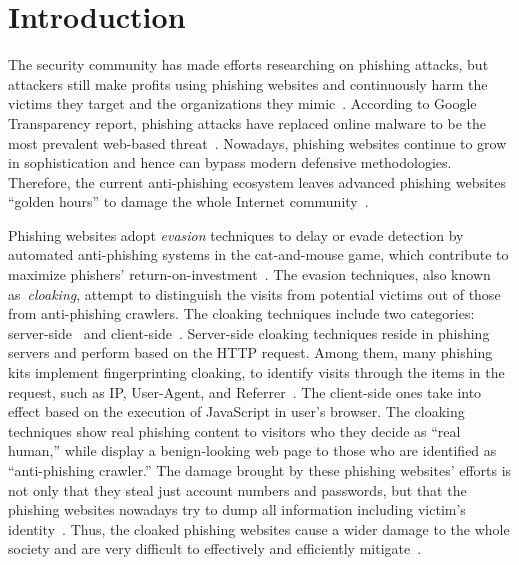 \section{Introduction}

The security community has made efforts researching on phishing attacks,
but attackers still make profits using phishing websites and continuously harm the victims they target and the organizations they mimic~\cite{ho2019detecting, van2019cognitive}.
According to Google Transparency report, phishing attacks have replaced online malware to be the most prevalent web-based threat~\cite{googletransparencyreport, solutions2019verizon}.
Nowadays, phishing websites continue to grow in sophistication and hence can bypass modern defensive methodologies.
Therefore, the current anti-phishing ecosystem leaves advanced phishing websites ``golden hours'' to damage the whole Internet community~\cite{oest2020sunrise}.

Phishing websites adopt \emph{evasion} techniques to delay or evade detection by automated anti-phishing systems in the cat-and-mouse game,
which contribute to maximize phishers' return-on-investment~\cite{thomas2017data}.
The evasion techniques, also known as~\emph{cloaking}, 
attempt to distinguish the visits from potential victims out of those from anti-phishing crawlers.
The cloaking techniques include two categories: server-side~\cite{oest2018inside} and client-side~\cite{zhang2021crawlphish}.
Server-side cloaking techniques reside in phishing servers and perform based on the HTTP request. 
Among them, many phishing kits implement fingerprinting cloaking, to identify visits through the items in the request, such as IP, User-Agent, and Referrer~\cite{oest2018inside}.
The client-side ones take into effect based on the execution of JavaScript in user's browser.
The cloaking techniques show real phishing content to visitors who they decide as ``real human,'' while display a benign-looking web page to those who are identified as ``anti-phishing crawler.''
The damage brought by these phishing websites' efforts is not only that they steal just account numbers and passwords,
but that the phishing websites nowadays try to dump all information including victim's identity~\cite{thomas2017data}.
Thus, the cloaked phishing websites cause a wider damage to the whole society and are very difficult to effectively and efficiently mitigate~\cite{oest2020sunrise, zhang2021crawlphish}.

